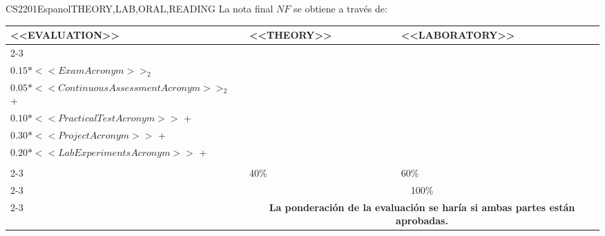   \begin{evaluation}{CS2201}{Espanol}{THEORY,LAB,ORAL,READING}
  La nota final $NF$ se obtiene a través de:
  
  \begin{tabularx}{0.9\textwidth}{|X|p{}|p{}|} \hline
  \multirow{4}{*}{\uppercase{<<Evaluation>>}} & \uppercase{<<Theory>>} & \uppercase{<<Laboratory>>} \\ \cline{2-3}
  & %
      \begin{minipage}{0.95\textwidth}
      \begin{tabular}{l}
          $0.15*<<ExamAcronym>>_{1}$ + \\
          $0.15*<<ExamAcronym>>_{2}$
          \end{tabular} 
      \end{minipage} 
  & %
      \begin{minipage}{0.95\textwidth}
      \begin{tabular}{l}
          $0.05*<<ContinuousAssessmentAcronym>>_{1}$ + \\
          $0.05*<<ContinuousAssessmentAcronym>>_{2}$ + \\
          $0.10*<<PracticalTestAcronym>>$ + \\
          $0.30*<<ProjectAcronym>>$ + \\
          $0.20*<<LabExperimentsAcronym>>$ + \\
      \end{tabular} 
      \end{minipage}                 \\ \cline{2-3}
  & %
  40\% 
  & %
  60\% \\ \cline{2-3}
  & \multicolumn{2}{c|}{100\%}  \\ \cline{2-3}
  & \multicolumn{2}{c|}{\textbf{\textbf{La ponderación de la evaluación se haría si ambas partes están aprobadas.}}}  \\ \hline
  \end{tabularx}
    

\end{evaluation}

